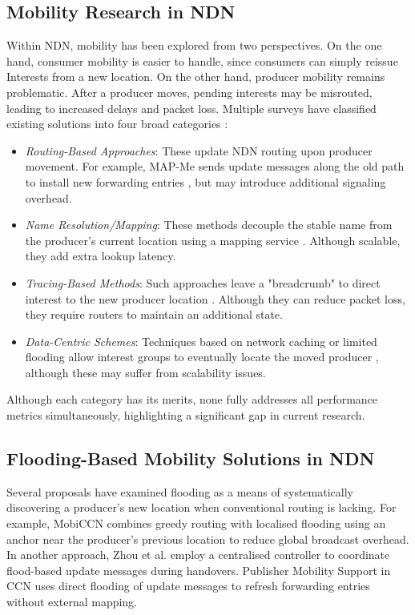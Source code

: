 \subsection{Mobility Research in NDN}
Within NDN, mobility has been explored from two perspectives. On the one hand, consumer mobility is easier to handle, since consumers can simply reissue Interests from a new location. On the other hand, producer mobility remains problematic. After a producer moves, pending interests may be misrouted, leading to increased delays and packet loss. Multiple surveys have classified existing solutions into four broad categories \cite{Zhang-16,Abrar-23,Fayyaz-23}:
\begin{itemize}
    \item \emph{Routing-Based Approaches}: These update NDN routing upon producer movement. For example, MAP-Me sends update messages along the old path to install new forwarding entries \cite{Zeng-18}, but may introduce additional signaling overhead.
    \item \emph{Name Resolution/Mapping}: These methods decouple the stable name from the producer’s current location using a mapping service \cite{Lee-12,Snamp-15}. Although scalable, they add extra lookup latency.
    \item \emph{Tracing-Based Methods}: Such approaches leave a "breadcrumb" to direct interest to the new producer location \cite{Kite-18}. Although they can reduce packet loss, they require routers to maintain an additional state.
    \item \emph{Data-Centric Schemes}: Techniques based on network caching or limited flooding allow interest groups to eventually locate the moved producer \cite{Jacobson-12,Wang-13}, although these may suffer from scalability issues.
\end{itemize}

Although each category has its merits, none fully addresses all performance metrics simultaneously, highlighting a significant gap in current research.

\subsection{Flooding-Based Mobility Solutions in NDN}
Several proposals have examined flooding as a means of systematically discovering a producer's new location when conventional routing is lacking. For example, MobiCCN \cite{Wang-13} combines greedy routing with localised flooding using an anchor near the producer's previous location to reduce global broadcast overhead. In another approach, Zhou et al. \cite{Zhou-14} employ a centralised controller to coordinate flood-based update messages during handovers. Publisher Mobility Support in CCN \cite{Han-14} uses direct flooding of update messages to refresh forwarding entries without external mapping.

